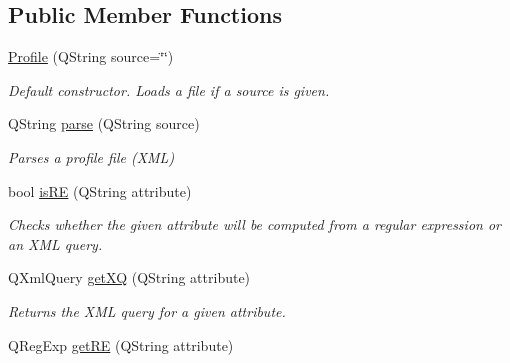 \subsection*{Public Member Functions}
\begin{DoxyCompactItemize}
\item 
\hypertarget{classProfile_abe18b870b228d83981a586e94eda9204}{
\hyperlink{classProfile_abe18b870b228d83981a586e94eda9204}{Profile} (QString source=\char`\"{}\char`\"{})}
\label{classProfile_abe18b870b228d83981a586e94eda9204}

\begin{DoxyCompactList}\small\item\em Default constructor. Loads a file if a source is given. \item\end{DoxyCompactList}\item 
\hypertarget{classProfile_aaba4d8a92e84b7a69b80c2fa54b6dd94}{
QString \hyperlink{classProfile_aaba4d8a92e84b7a69b80c2fa54b6dd94}{parse} (QString source)}
\label{classProfile_aaba4d8a92e84b7a69b80c2fa54b6dd94}

\begin{DoxyCompactList}\small\item\em Parses a profile file (XML) \item\end{DoxyCompactList}\item 
\hypertarget{classProfile_ab3146556cdf67e0f94a2cefa79c9266c}{
bool \hyperlink{classProfile_ab3146556cdf67e0f94a2cefa79c9266c}{isRE} (QString attribute)}
\label{classProfile_ab3146556cdf67e0f94a2cefa79c9266c}

\begin{DoxyCompactList}\small\item\em Checks whether the given attribute will be computed from a regular expression or an XML query. \item\end{DoxyCompactList}\item 
\hypertarget{classProfile_a07edc13955ce110e3e99e1395bbbbd18}{
QXmlQuery \hyperlink{classProfile_a07edc13955ce110e3e99e1395bbbbd18}{getXQ} (QString attribute)}
\label{classProfile_a07edc13955ce110e3e99e1395bbbbd18}

\begin{DoxyCompactList}\small\item\em Returns the XML query for a given attribute. \item\end{DoxyCompactList}\item 
\hypertarget{classProfile_a10cfa848ad75d2b01d463cb4ff49090d}{
QRegExp \hyperlink{classProfile_a10cfa848ad75d2b01d463cb4ff49090d}{getRE} (QString attribute)}
\label{classProfile_a10cfa848ad75d2b01d463cb4ff49090d}


\end{DoxyCompactItemize}
